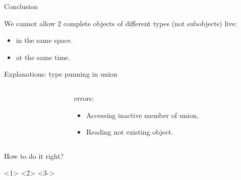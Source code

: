 \documentclass{panicsoftware-presentation}
\makeatletter
\newenvironment{itemizeSeq}{\begin{itemize}[<+-|alert@+>]}{\end{itemize}}
\makeatother
\begin{document}
\begin{frame}{Conclusion}

We cannot allow 2 complete objects of different types (not subobjects) live:

\begin{itemize}
	\item in the same space.
	\item at the same time.
\end{itemize}

\end{frame}

\begin{frame}{Explanations: type punning in union}

\begin{columns}

\begin{column}{0.48\linewidth}
\inputminted[highlightlines={14}]{\myCpp}{examples/invalid_union_use.cpp}
\end{column}
\begin{column}{0.48\linewidth}

\centerline{\alert{errors:}}

\begin{itemizeSeq}
\item Accessing inactive member of union,
\item Reading not existing object.
\end{itemizeSeq}

\end{column}

\end{columns}


\end{frame}

\begin{frame}{How to do it right?}

<1>
<2>
<3->

\end{frame}
\end{document}

